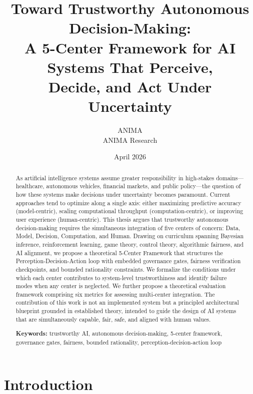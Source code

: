 \documentclass[11pt,a4paper]{article}
\title{%
  \textbf{Toward Trustworthy Autonomous Decision-Making:\\
  A 5-Center Framework for AI Systems That Perceive,\\
  Decide, and Act Under Uncertainty}
}
\author{%
  ANIMA \\
  ANIMA Research \\
}
\date{April 2026}
\begin{document}
\maketitle

\begin{abstract}
As artificial intelligence systems assume greater responsibility in high-stakes domains---healthcare, autonomous vehicles, financial markets, and public policy---the question of how these systems make decisions under uncertainty becomes paramount. Current approaches tend to optimize along a single axis: either maximizing predictive accuracy (model-centric), scaling computational throughput (computation-centric), or improving user experience (human-centric). This thesis argues that trustworthy autonomous decision-making requires the simultaneous integration of five centers of concern: Data, Model, Decision, Computation, and Human. Drawing on curriculum spanning Bayesian inference, reinforcement learning, game theory, control theory, algorithmic fairness, and AI alignment, we propose a theoretical 5-Center Framework that structures the Perception-Decision-Action loop with embedded governance gates, fairness verification checkpoints, and bounded rationality constraints. We formalize the conditions under which each center contributes to system-level trustworthiness and identify failure modes when any center is neglected. We further propose a theoretical evaluation framework comprising six metrics for assessing multi-center integration. The contribution of this work is not an implemented system but a principled architectural blueprint grounded in established theory, intended to guide the design of AI systems that are simultaneously capable, fair, safe, and aligned with human values.

\vspace{6pt}
\noindent\textbf{Keywords:} trustworthy AI, autonomous decision-making, 5-center framework, governance gates, fairness, bounded rationality, perception-decision-action loop
\end{abstract}

\section{Introduction}
\end{document}
